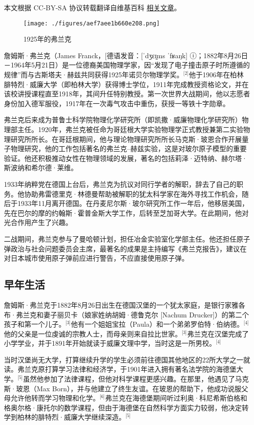 
本文根据 CC-BY-SA 协议转载翻译自维基百科 \href{https://en.wikipedia.org/wiki/James_Franck}{相关文章}。

\begin{figure}[ht]
\centering
\texttt{[image: ./figures/aef7aee1b660e208.png]}
\caption{1925年的弗兰克} \label{fig_ZMSflk_4}
\end{figure}
詹姆斯·弗兰克（James Franck，[德语发音：[ˈdʒɛɪ̯ms ˈfʁaŋk] ⓘ；1882年8月26日－1964年5月21日）是一位德裔美国物理学家，因“发现了电子撞击原子时所遵循的规律”而与古斯塔夫·赫兹共同获得1925年诺贝尔物理学奖。\(^\text{[2]}\)他于1906年在柏林腓特烈·威廉大学（即柏林大学）获得博士学位，1911年完成教授资格论文，并在该校讲授课程直至1918年，其间升任特别教授。第一次世界大战期间，他以志愿者身份加入德军服役，1917年在一次毒气攻击中重伤，获授一等铁十字勋章。

弗兰克后来成为普鲁士科学院物理化学研究所（即凯撒·威廉物理化学研究所）物理部主任。1920年，弗兰克被任命为哥廷根大学实验物理学正式教授兼第二实验物理研究所所长。在哥廷根期间，他与理论物理研究所所长马克斯·玻恩合作开展量子物理研究，他的工作包括著名的弗兰克–赫兹实验，这是对玻尔原子模型的重要验证。他还积极推动女性在物理领域的发展，著名的包括莉泽·迈特纳、赫尔塔·斯波纳和希尔德·莱维。

1933年纳粹党在德国上台后，弗兰克为抗议对同行学者的解职，辞去了自己的职务。他协助弗雷德里克·林德曼帮助被解职的犹太科学家在海外寻找工作机会，随后于1933年11月离开德国。在丹麦尼尔斯·玻尔研究所工作一年后，他移居美国，先在巴尔的摩的约翰斯·霍普金斯大学工作，后转至芝加哥大学。在此期间，他对光合作用产生了兴趣。

二战期间，弗兰克参与了曼哈顿计划，担任冶金实验室化学部主任。他还担任原子弹政治与社会问题委员会主席，最著名的成果是主持编写《弗兰克报告》，建议在对日本城市使用原子弹前应进行警告，不应直接使用原子弹。
\subsection{早年生活}
詹姆斯·弗兰克于1882年8月26日出生在德国汉堡的一个犹太家庭，是银行家雅各布·弗兰克和妻子丽贝卡（娘家姓纳胡姆·德鲁克尔 [Nachum Drucker]）的第二个孩子和第一个儿子。\(^\text{[3]}\)他有一个姐姐宝拉（Paula）和一个弟弟罗伯特·伯纳德。\(^\text{[4]}\)他的父亲是一位虔诚的宗教人士，而母亲则来自拉比世家。\(^\text{[3]}\)弗兰克在汉堡完成了小学学业，并于1891年开始就读于威廉文理中学，当时这是一所男校。\(^\text{[4]}\)

当时汉堡尚无大学，打算继续升学的学生必须前往德国其他地区的22所大学之一就读。弗兰克原打算学习法律和经济学，于1901年进入拥有著名法学院的海德堡大学。\(^\text{[5]}\)虽然他参加了法律课程，但他对科学课程更感兴趣。在那里，他遇见了马克斯·玻恩（Max Born），并与他建立了终生友谊。在玻恩的帮助下，他成功说服父母允许他转而学习物理和化学。\(^\text{[6]}\)弗兰克在海德堡期间听过利奥·科尼希斯伯格和格奥尔格·康托尔的数学课程，但由于海德堡在自然科学方面实力较弱，他决定转学到柏林的腓特烈·威廉大学继续深造。\(^\text{[5]}\)

